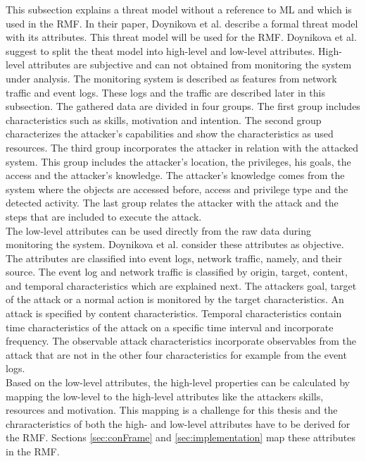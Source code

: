 This subsection explains a threat model without a reference to ML and which is used in the RMF. In their paper, Doynikova et al. \cite{DBLP:conf/crisis/DoynikovaNGK20} describe a formal threat model with its attributes. This threat model will be used for the RMF. Doynikova et al. suggest to split the theat model into high-level and low-level attributes.
High-level attributes are subjective and can not obtained from monitoring the system under analysis. The monitoring system is described as features from network traffic and event logs. These logs and the traffic are described later in this subsection. The gathered data are divided in four groups. The first group includes characteristics such as
skills, motivation and intention. The second group characterizes the attacker's capabilities and show the characteristics as used resources. The third group incorporates the attacker in
relation with the attacked system. This group includes the attacker's location, the privileges, his goals, the access and the attacker's knowledge. The attacker's knowledge comes from the
system where the objects are accessed before, access and privilege type and the detected activity. The last group relates the attacker with the attack and the steps that are included to
execute the attack. \\
The low-level attributes can be used directly from the raw data during monitoring the system. Doynikova et al. consider these attributes as objective. The attributes are classified into event logs, network traffic, namely, and their source. The event log and network traffic is classified by origin, target, content, and temporal characteristics \cite{DBLP:journals/ijcysa/FraunholzKAS17} which are explained next. The attackers goal, target of the attack or a normal action is monitored by the target characteristics. An attack is specified by content characteristics. Temporal
characteristics contain time characteristics of the attack on a specific time interval and incorporate frequency. The observable attack characteristics incorporate observables from the attack that are not in the other four characteristics for example from the event logs. \\
Based on the low-level attributes, the high-level properties can be calculated by mapping the low-level to the high-level attributes like the attackers skills, resources and motivation. This mapping is a challenge for this thesis and the chraracteristics of both the high- and low-level attributes have to be derived for the RMF. Sections \ref{sec:conFrame} and \ref{sec:implementation} map these attributes in the RMF.

